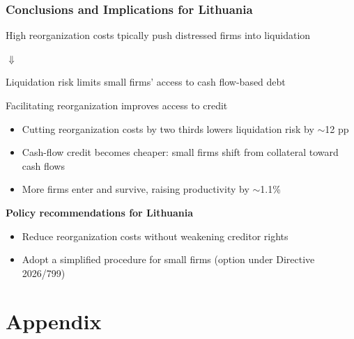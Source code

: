 \documentclass[aspectratio=169,xcolor=table]{beamer}
\begin{document}
\begin{frame}[label=implications] \frametitle{Conclusions and Implications for Lithuania}

High reorganization costs tpically push distressed firms into liquidation \vspace{-1.5mm}

\hspace{50mm} \textcolor{primary}{$\boldsymbol{\Downarrow}$} \vspace{-2mm}

Liquidation risk limits small firms' access to cash flow-based debt \normalsize \vspace{3mm}

\pause

Facilitating reorganization improves access to credit 
\begin{itemize} \small
    \item Cutting reorganization costs by two thirds lowers liquidation risk by $\sim$12 pp 
    \item Cash-flow credit becomes cheaper: small firms shift from collateral toward cash flows 
    \item More firms enter and survive, raising productivity by $\sim$1.1\%
\end{itemize} \normalsize \vspace{4mm}

\textbf{Policy recommendations for Lithuania}
\begin{itemize} \small
    \item Reduce reorganization costs without weakening creditor rights
    \item Adopt a simplified procedure for small firms {\footnotesize (option under Directive 2026/799)}
    \end{itemize}
 
\end{frame}


\appendix
\section{Appendix}
\end{document}
